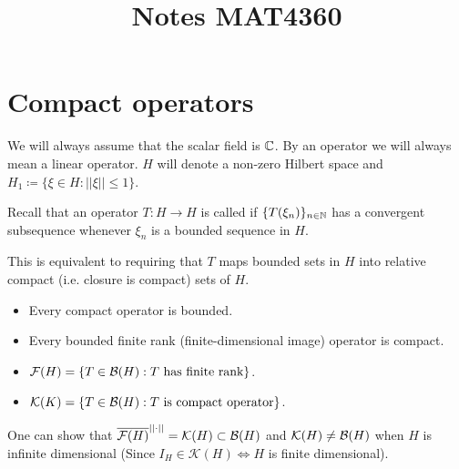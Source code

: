 \documentclass[10pt,english,a4paper]{article}
\title{Notes MAT4360}
\theoremstyle{definition}
\let\emph\relax %
\def\Ff{\mathcal{F}}
\def\Kf{\mathcal{K}}
\begin{document}
\maketitle

\section{Compact operators}
We will always assume that the scalar field is $\mathbb{C}$. By an operator we will always 
mean a linear operator. $H$ will denote a non-zero Hilbert space and 
$H_1 \coloneqq \{ \xi \in H : ||\xi||\leq 1 \}$.

Recall that an operator $T \colon H \to H$ is called \emph{compact} if 
$\{T(\xi_n)\}_{n \in \mathbb{N}}$ has a convergent subsequence whenever $\xi_n$ is 
a bounded sequence in $H$.

This is equivalent to requiring that $T$ maps bounded sets in $H$ into relative compact (i.e. closure is compact) sets of $H$.

\begin{itemize}
    \item Every compact operator is bounded. 
    \item Every bounded finite rank (finite-dimensional image) operator is compact.
    \item $\Ff(H) = \{ T \in \Bs(H): T \text{ has finite rank} \}$. 
    \item $\Kf(K) = \{T \in \Bs(H) : T \text{ is compact operator}\}$.
\end{itemize}
One can show that $\ol{\Ff(H)}^{||\cdot||} = \Kf(H) \subset \Bs(H)$ 
and $\Kf(H) \neq \Bs(H)$ when $H$ is infinite dimensional (Since $I_{H} \in
\Kf(H) \iff H$ is finite dimensional). 
\end{document}
